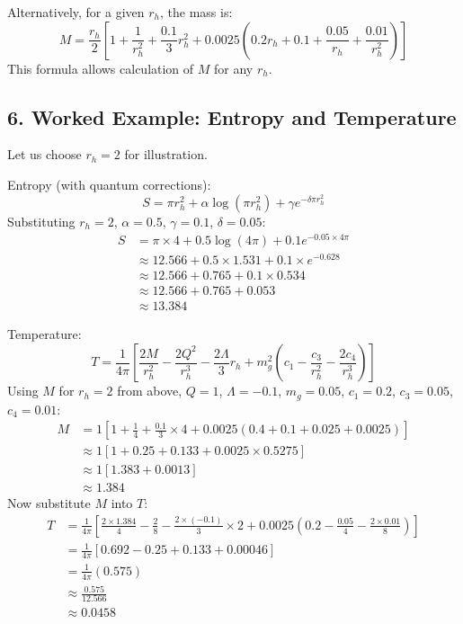 \documentclass[12pt]{article}
\begin{document}
Alternatively, for a given $r_h$, the mass is:
\begin{equation}
M = \frac{r_h}{2} \left[1 + \frac{1}{r_h^2} + \frac{0.1}{3} r_h^2 + 0.0025 (0.2 r_h + 0.1 + \frac{0.05}{r_h} + \frac{0.01}{r_h^2})\right]
\end{equation}
This formula allows calculation of $M$ for any $r_h$.

\subsection*{6. Worked Example: Entropy and Temperature}
Let us choose $r_h = 2$ for illustration.

Entropy (with quantum corrections):
\begin{equation}
S = \pi r_h^2 + \alpha \log(\pi r_h^2) + \gamma e^{-\delta \pi r_h^2}
\end{equation}
Substituting $r_h = 2$, $\alpha = 0.5$, $\gamma = 0.1$, $\delta = 0.05$:
\begin{align*}
S &= \pi \times 4 + 0.5 \log(4\pi) + 0.1 e^{-0.05 \times 4\pi} \\
  &\approx 12.566 + 0.5 \times 1.531 + 0.1 \times e^{-0.628} \\
  &\approx 12.566 + 0.765 + 0.1 \times 0.534 \\
  &\approx 12.566 + 0.765 + 0.053 \\
  &\approx 13.384
\end{align*}

Temperature:
\begin{equation}
T = \frac{1}{4\pi} \left[ \frac{2M}{r_h^2} - \frac{2Q^2}{r_h^3} - \frac{2\Lambda}{3} r_h + m_g^2 \left(c_1 - \frac{c_3}{r_h^2} - \frac{2c_4}{r_h^3}\right) \right]
\end{equation}
Using $M$ for $r_h = 2$ from above, $Q = 1$, $\Lambda = -0.1$, $m_g = 0.05$, $c_1 = 0.2$, $c_3 = 0.05$, $c_4 = 0.01$:
\begin{align*}
M &= 1 \left[1 + \frac{1}{4} + \frac{0.1}{3} \times 4 + 0.0025 (0.4 + 0.1 + 0.025 + 0.0025)\right] \\
  &\approx 1 [1 + 0.25 + 0.133 + 0.0025 \times 0.5275] \\
  &\approx 1 [1.383 + 0.0013] \\
  &\approx 1.384
\end{align*}
Now substitute $M$ into $T$:
\begin{align*}
T &= \frac{1}{4\pi} \left[ \frac{2 \times 1.384}{4} - \frac{2}{8} - \frac{2 \times (-0.1)}{3} \times 2 + 0.0025 (0.2 - \frac{0.05}{4} - \frac{2 \times 0.01}{8}) \right] \\
  &= \frac{1}{4\pi} [0.692 - 0.25 + 0.133 + 0.00046] \\
  &= \frac{1}{4\pi} (0.575) \\
  &\approx \frac{0.575}{12.566} \\
  &\approx 0.0458
\end{align*}
\end{document}
